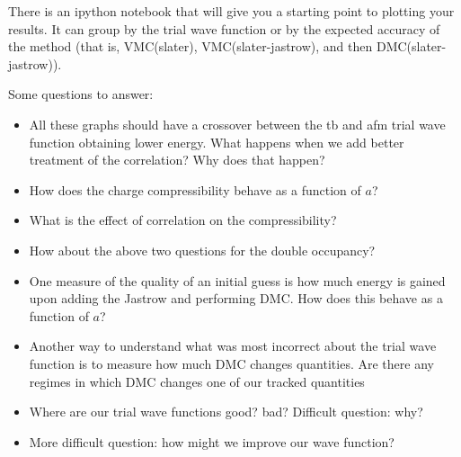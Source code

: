 \documentclass[12pt]{article}
\begin{document}
There is an ipython notebook that will give you a starting point to plotting your results. 
It can group by the trial wave function or by the expected accuracy of the method (that is, VMC(slater), VMC(slater-jastrow), and then DMC(slater-jastrow)).

Some questions to answer:
\begin{itemize}
\item All these graphs should have a crossover between the tb and afm trial wave function obtaining lower energy. What happens when we add better treatment of the correlation? Why does that happen?
\item How does the charge compressibility behave as a function of $a$? 
\item What is the effect of correlation on the compressibility? 
\item How about the above two questions for the double occupancy?
\item One measure of the quality of an initial guess is how much energy is gained upon adding the Jastrow and performing DMC. How does this behave as a function of $a$?
\item Another way to understand what was most incorrect about the trial wave function is to measure how much DMC changes quantities. Are there any regimes in which DMC changes one of our tracked quantities
\item Where are our trial wave functions good? bad? Difficult question: why?
\item More difficult question: how might we improve our wave function?
\end{itemize}
\end{document}

